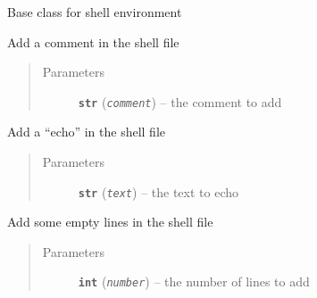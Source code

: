 \documentclass[a4paper,10pt,english]{sphinxmanual}
\begin{document}
\begin{fulllineitems}
\label{commands/apidoc/src:src.fileEnviron.FileEnviron}
Base class for shell environment

\begin{fulllineitems}
\label{commands/apidoc/src:src.fileEnviron.FileEnviron.add_comment}
Add a comment in the shell file
\begin{quote}\begin{description}
\item[{Parameters}] \leavevmode
\textbf{\texttt{str}} (\emph{\texttt{comment}}) -- the comment to add

\end{description}\end{quote}

\end{fulllineitems}


\begin{fulllineitems}
\label{commands/apidoc/src:src.fileEnviron.FileEnviron.add_echo}
Add a ``echo'' in the shell file
\begin{quote}\begin{description}
\item[{Parameters}] \leavevmode
\textbf{\texttt{str}} (\emph{\texttt{text}}) -- the text to echo

\end{description}\end{quote}

\end{fulllineitems}


\begin{fulllineitems}
\label{commands/apidoc/src:src.fileEnviron.FileEnviron.add_line}
Add some empty lines in the shell file
\begin{quote}\begin{description}
\item[{Parameters}] \leavevmode
\textbf{\texttt{int}} (\emph{\texttt{number}}) -- the number of lines to add


\end{description}
\end{quote}
\end{fulllineitems}
\end{fulllineitems}
\end{document}
